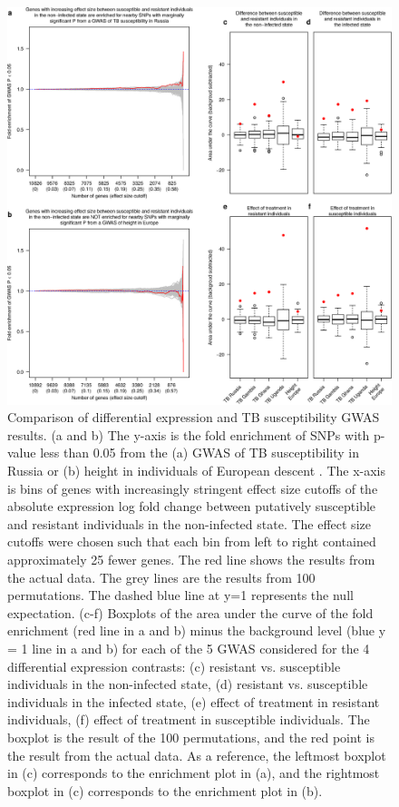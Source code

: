 \documentclass[fleqn,10pt]{wlscirep}
\begin{document}
\begin{figure}[p]
\centering
\includegraphics[width=\linewidth]{../figure/gwas-final.eps}
\caption{
Comparison of differential expression and TB susceptibility GWAS
results. (a and b) The y-axis is the fold enrichment of SNPs with
p-value less than 0.05 from the (a) GWAS of TB susceptibility in
Russia \cite{Curtis2015} or (b) height in individuals of European
descent \cite{LangoAllen2010}. The x-axis is bins of genes with
increasingly stringent effect size cutoffs of the absolute expression
log fold change between putatively susceptible and resistant
individuals in the non-infected state. The effect size cutoffs were
chosen such that each bin from left to right contained approximately
25 fewer genes. The red line shows the results from the actual data.
The grey lines are the results from 100 permutations. The dashed blue
line at y=1 represents the null expectation. (c-f) Boxplots of the
area under the curve of the fold enrichment (red line in a and b)
minus the background level (blue y = 1 line in a and b) for each of
the 5 GWAS \cite{Curtis2015, Thye2010, Sobota2016} considered for the
4 differential expression contrasts: (c) resistant vs. susceptible
individuals in the non-infected state, (d) resistant vs. susceptible
individuals in the infected state, (e) effect of treatment in
resistant individuals, (f) effect of treatment in susceptible
individuals. The boxplot is the result of the 100 permutations, and
the red point is the result from the actual data. As a reference, the
leftmost boxplot in (c) corresponds to the enrichment plot in (a), and
the rightmost boxplot in (c) corresponds to the enrichment plot in
(b).
}
\label{fig:gwas}
\end{figure}
\end{document}
